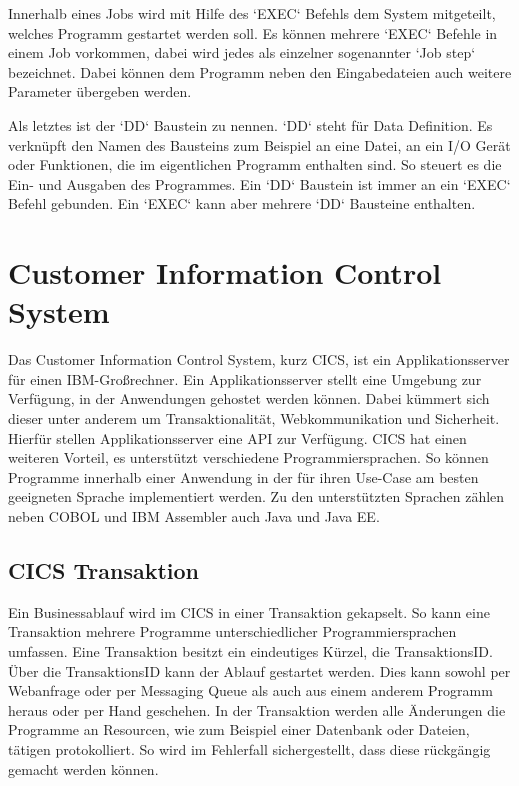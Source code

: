 Innerhalb eines Jobs wird mit Hilfe des `EXEC` Befehls dem System mitgeteilt, welches Programm gestartet werden soll.
Es können mehrere `EXEC` Befehle in einem Job vorkommen, dabei wird jedes als einzelner sogenannter `Job step` bezeichnet.
Dabei können dem Programm neben den Eingabedateien auch weitere Parameter übergeben werden.

Als letztes ist der `DD` Baustein zu nennen.
`DD` steht für Data Definition.
Es verknüpft den Namen des Bausteins zum Beispiel an eine Datei, an ein I/O Gerät oder Funktionen, die im eigentlichen Programm enthalten sind.
So steuert es die Ein- und Ausgaben des Programmes.
Ein `DD` Baustein ist immer an ein `EXEC` Befehl gebunden.
Ein `EXEC` kann aber mehrere `DD` Bausteine enthalten.
\cite{Ebbers.2011}

\section{Customer Information Control System}\label{cics}
Das Customer Information Control System, kurz CICS, ist ein Applikationsserver für einen IBM-Großrechner.
Ein Applikationsserver stellt eine Umgebung zur Verfügung, in der Anwendungen gehostet werden können.
Dabei kümmert sich dieser unter anderem um Transaktionalität, Webkommunikation und Sicherheit.
Hierfür stellen Applikationsserver eine API zur Verfügung.
CICS hat einen weiteren Vorteil, es unterstützt verschiedene Programmiersprachen.
So können Programme innerhalb einer Anwendung in der für ihren Use-Case am besten geeigneten Sprache implementiert werden.
Zu den unterstützten Sprachen zählen neben COBOL und IBM Assembler auch Java und Java EE.
\cite{Rayns.2011}

\subsection{CICS Transaktion}\label{subsec:trans}
Ein Businessablauf wird im CICS in einer Transaktion gekapselt.
So kann eine Transaktion mehrere Programme unterschiedlicher Programmiersprachen umfassen.
Eine Transaktion besitzt ein eindeutiges Kürzel, die TransaktionsID.
Über die TransaktionsID kann der Ablauf gestartet werden.
Dies kann sowohl per Webanfrage oder per Messaging Queue als auch aus einem anderem Programm heraus oder per Hand geschehen.
In der Transaktion werden alle Änderungen die Programme an Resourcen, wie zum Beispiel einer Datenbank oder Dateien, tätigen protokolliert.
So wird im Fehlerfall sichergestellt, dass diese rückgängig gemacht werden können.
 \cite{Rayns.2011}

